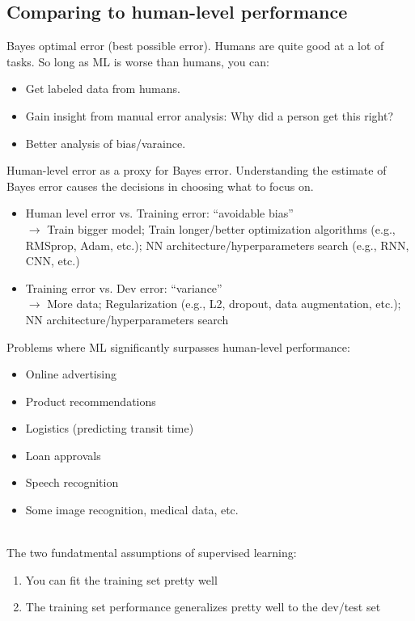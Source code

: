 %
\subsection{Comparing to human-level performance}
Bayes optimal error (best possible error).
Humans are quite good at a lot of tasks. So long as ML is worse than humans, you can:
\begin{itemize}
\item[]
Get labeled data from humans.
\item[]
Gain insight from manual error analysis: Why did a person get this right?
\item[]
Better analysis of bias/varaince.
\end{itemize}
Human-level error as a proxy for Bayes error. Understanding the estimate of Bayes error causes the decisions in choosing what to focus on.
\begin{itemize}
\item
Human level error vs. Training error: ``avoidable bias''\\
$\rightarrow$ Train bigger model; Train longer/better optimization algorithms (e.g., RMSprop, Adam, etc.); NN architecture/hyperparameters search (e.g., RNN, CNN, etc.)
\item
Training error vs. Dev error: ``variance''\\
$\rightarrow$ More data; Regularization (e.g., L2, dropout, data augmentation, etc.); NN architecture/hyperparameters search
\end{itemize}

Problems where ML significantly surpasses human-level performance:
\begin{itemize}
\item[]
Online advertising
\item[]
Product recommendations
\item[]
Logistics (predicting transit time)
\item[]
Loan approvals
\item[]
Speech recognition
\item[]
Some image recognition, medical data, etc.
\end{itemize}
~\\
The two fundatmental assumptions of supervised learning:
\begin{enumerate}
\item
You can fit the training set pretty well
\item
The training set performance generalizes pretty well to the dev/test set
\end{enumerate}


